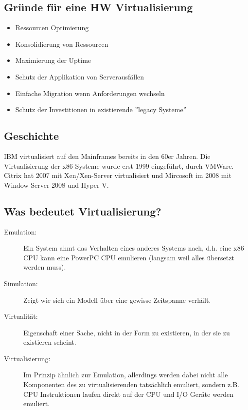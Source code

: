 \subsection{Gründe für eine HW Virtualisierung}
\label{sec:gruende-hw-virtualisierung}
\begin{itemize}
	\item Ressourcen Optimierung
	\item Konsolidierung von Ressourcen
	\item Maximierung der Uptime
	\item Schutz der Applikation von Serverausfällen
	\item Einfache Migration wenn Anforderungen wechseln
	\item Schutz der Investitionen in existierende ''legacy Systeme'' 
\end{itemize}

\subsection{Geschichte}
IBM virtualisiert auf den Mainframes bereits in den 60er Jahren. Die Virtualisierung der x86-Systeme wurde erst 1999 eingeführt, durch VMWare. Citrix hat 2007 mit Xen/Xen-Server virtualisiert und Mircosoft im 2008 mit Window Server 2008 und Hyper-V.

\subsection{Was bedeutet Virtualisierung?}
\label{sec:was-bedeutet-virtualisierung}
\begin{description}
	\item[Emulation:] Ein System ahmt das Verhalten eines anderes Systems nach, d.h. eine x86 CPU kann eine PowerPC CPU emulieren (langsam weil alles übersetzt werden muss).
	\item[Simulation:] Zeigt wie sich ein Modell über eine gewisse Zeitspanne verhält.
	\item[Virtualität:] Eigenschaft einer Sache, nicht in der Form zu existieren, in der sie zu existieren scheint.
	\item[Virtualisierung:] Im Prinzip ähnlich zur Emulation, allerdings werden dabei nicht alle Komponenten des zu virtualisierenden tatsächlich emuliert, sondern z.B. CPU Instruktionen laufen direkt auf der CPU und I/O Geräte werden emuliert.
\end{description}

